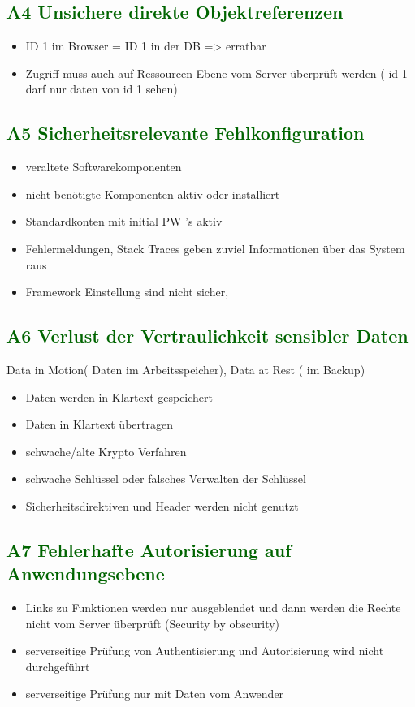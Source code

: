 \subsection*{\textcolor{darkgreen}{A4 Unsichere direkte Objektreferenzen}}

	\begin{itemize}
	\item ID 1 im Browser = ID 1 in der DB => erratbar
	\item Zugriff muss auch auf Ressourcen Ebene vom Server überprüft werden ( id 1 darf nur daten von id 1 sehen)
	\end{itemize}



\subsection*{\textcolor{darkgreen}{A5 Sicherheitsrelevante Fehlkonfiguration}}

	\begin{itemize}
	\item veraltete Softwarekomponenten
	\item nicht benötigte Komponenten aktiv oder installiert
	\item Standardkonten mit initial PW\'{ '}s aktiv 
	\item Fehlermeldungen, Stack Traces geben zuviel Informationen über das System raus
	\item Framework Einstellung sind nicht sicher,
	\end{itemize}

\subsection*{\textcolor{darkgreen}{A6 Verlust der Vertraulichkeit sensibler Daten}}
Data in Motion( Daten im Arbeitsspeicher), Data at Rest ( im Backup) 
	\begin{itemize}
	\item Daten werden in Klartext gespeichert
	\item Daten in Klartext übertragen
	\item schwache/alte Krypto Verfahren
	\item schwache Schlüssel oder falsches Verwalten der Schlüssel
	\item Sicherheitsdirektiven und Header werden nicht genutzt
	\end{itemize}

\subsection*{\textcolor{darkgreen}{A7 Fehlerhafte Autorisierung auf Anwendungsebene}}
\begin{itemize}
	\item Links zu Funktionen werden nur ausgeblendet und dann werden die Rechte nicht vom Server überprüft (Security by obscurity)
	\item serverseitige Prüfung von Authentisierung und Autorisierung wird nicht durchgeführt
	\item serverseitige Prüfung nur mit Daten vom Anwender
\end{itemize}

